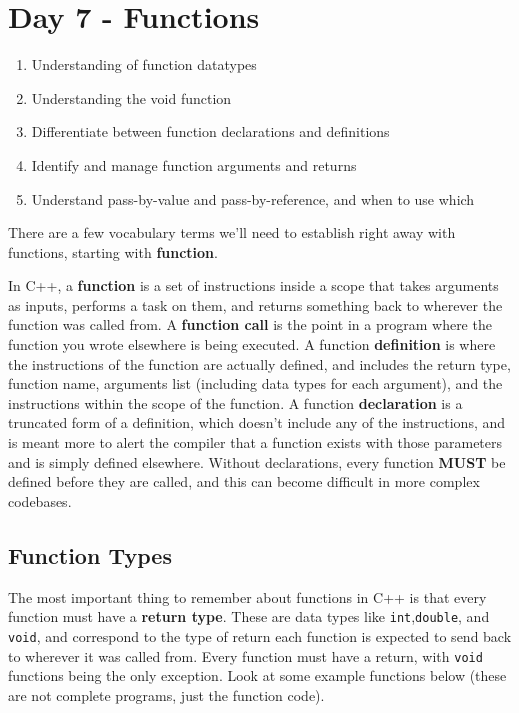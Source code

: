 \chapter{Day 7 - Functions}
\begin{Goals}
\begin{enumerate}
    \item Understanding of function datatypes
    \item Understanding the void function
    \item Differentiate between function declarations and definitions
    \item Identify and manage function arguments and returns
    \item Understand pass-by-value and pass-by-reference, and when to use which
\end{enumerate}
\end{Goals}

There are a few vocabulary terms we'll need to establish right away with functions, starting with \textbf{function}.

In C++, a \textbf{function} is a set of instructions inside a scope that takes arguments as inputs, performs a task on them, and returns something back to wherever the function was called from.  A \textbf{function call} is the point in a program where the function you wrote elsewhere is being executed.  A function \textbf{definition} is where the instructions of the function are actually defined, and includes the return type, function name, arguments list (including data types for each argument), and the instructions within the scope of the function.  A function \textbf{declaration} is a truncated form of a definition, which doesn't include any of the instructions, and is meant more to alert the compiler that a function exists with those parameters and is simply defined elsewhere.  Without declarations, every function \textbf{MUST} be defined before they are called, and this can become difficult in more complex codebases.

\section{Function Types}
The most important thing to remember about functions in C++ is that every function must have a \textbf{return type}.  These are data types like \texttt{int},\texttt{double}, and \texttt{void}, and correspond to the type of return each function is expected to send back to wherever it was called from.  Every function must have a return, with \texttt{void} functions being the only exception.  Look at some example functions below (these are not complete programs, just the function code).

